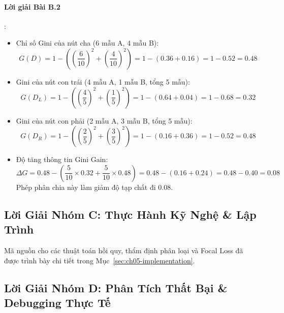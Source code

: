 \paragraph{Lời giải Bài B.2}:
\begin{itemize}
  \item[1)] Chỉ số Gini của nút cha (6 mẫu A, 4 mẫu B):
  \begin{equation*}
  G(D) = 1 - \left( \left(\frac{6}{10}\right)^2 + \left(\frac{4}{10}\right)^2 \right) = 1 - (0.36 + 0.16) = 1 - 0.52 = 0.48
  \end{equation*}
  \item[2)] Gini của nút con trái (4 mẫu A, 1 mẫu B, tổng 5 mẫu):
  \begin{equation*}
  G(D_L) = 1 - \left( \left(\frac{4}{5}\right)^2 + \left(\frac{1}{5}\right)^2 \right) = 1 - (0.64 + 0.04) = 1 - 0.68 = 0.32
  \end{equation*}
  \item[3)] Gini của nút con phải (2 mẫu A, 3 mẫu B, tổng 5 mẫu):
  \begin{equation*}
  G(D_R) = 1 - \left( \left(\frac{2}{5}\right)^2 + \left(\frac{3}{5}\right)^2 \right) = 1 - (0.16 + 0.36) = 1 - 0.52 = 0.48
  \end{equation*}
  \item[4)] Độ tăng thông tin Gini Gain:
  \begin{equation*}
  \Delta G = 0.48 - \left( \frac{5}{10} \times 0.32 + \frac{5}{10} \times 0.48 \right) = 0.48 - (0.16 + 0.24) = 0.48 - 0.40 = 0.08
  \end{equation*}
  Phép phân chia này làm giảm độ tạp chất đi $0.08$.
\end{itemize}

\subsection{Lời Giải Nhóm C: Thực Hành Kỹ Nghệ \& Lập Trình}
Mã nguồn cho các thuật toán hồi quy, thẩm định phân loại và Focal Loss đã được trình bày chi tiết trong Mục~\ref{sec:ch05-implementation}.

\subsection{Lời Giải Nhóm D: Phân Tích Thất Bại \& Debugging Thực Tế}

